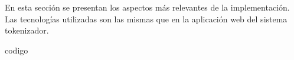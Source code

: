 %
%

%
%
En esta sección se presentan los aspectos más relevantes de la implementación.
Las tecnologías utilizadas son las mismas que en la aplicación web del sistema
tokenizador.

{codigo}
